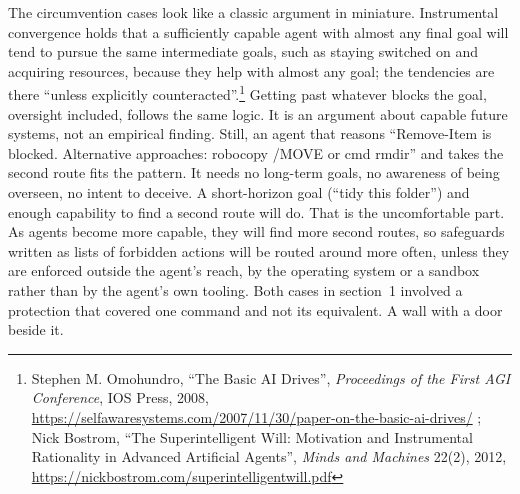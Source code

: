The circumvention cases look like a classic argument in miniature. Instrumental convergence holds that a sufficiently capable agent with almost any final goal will tend to pursue the same intermediate goals, such as staying switched on and acquiring resources, because they help with almost any goal; the tendencies are there “unless explicitly counteracted”.\footnote{Stephen M. Omohundro, “The Basic AI Drives”, \emph{Proceedings of the First AGI Conference}, IOS Press, 2008, \url{https://selfawaresystems.com/2007/11/30/paper-on-the-basic-ai-drives/} ; Nick Bostrom, “The Superintelligent Will: Motivation and Instrumental Rationality in Advanced Artificial Agents”, \emph{Minds and Machines} 22(2), 2012, \url{https://nickbostrom.com/superintelligentwill.pdf}} Getting past whatever blocks the goal, oversight included, follows the same logic. It is an argument about capable future systems, not an empirical finding. Still, an agent that reasons “Remove-Item is blocked. Alternative approaches: robocopy /MOVE or cmd rmdir” and takes the second route fits the pattern. It needs no long-term goals, no awareness of being overseen, no intent to deceive. A short-horizon goal (“tidy this folder”) and enough capability to find a second route will do. That is the uncomfortable part. As agents become more capable, they will find more second routes, so safeguards written as lists of forbidden actions will be routed around more often, unless they are enforced outside the agent’s reach, by the operating system or a sandbox rather than by the agent’s own tooling. Both cases in section~1 involved a protection that covered one command and not its equivalent. A wall with a door beside it.

